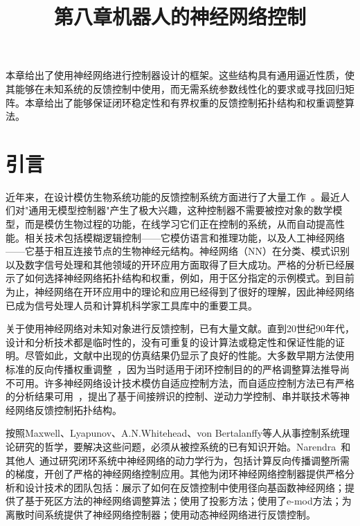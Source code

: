 \documentclass[12pt,a4paper]{ctexart}
\title{第八章\quad 机器人的神经网络控制}
\author{}
\date{}
\begin{document}
  \maketitle
\fi

本章给出了使用神经网络进行控制器设计的框架。这些结构具有通用逼近性质，使其能够在未知系统的反馈控制中使用，而无需系统参数线性化的要求或寻找回归矩阵。本章给出了能够保证闭环稳定性和有界权重的反馈控制拓扑结构和权重调整算法。

\section{引言}

近年来，在设计模仿生物系统功能的反馈控制系统方面进行了大量工作~\cite{white1992,miller1991}。最近人们对"通用无模型控制器"产生了极大兴趣，这种控制器不需要被控对象的数学模型，而是模仿生物过程的功能，在线学习它们正在控制的系统，从而自动提高性能。相关技术包括模糊逻辑控制——它模仿语言和推理功能，以及人工神经网络——它基于相互连接节点的生物神经元结构。神经网络（NN）在分类、模式识别以及数字信号处理和其他领域的开环应用方面取得了巨大成功。严格的分析已经展示了如何选择神经网络拓扑结构和权重，例如，用于区分指定的示例模式。到目前为止，神经网络在开环应用中的理论和应用已经得到了很好的理解，因此神经网络已成为信号处理人员和计算机科学家工具库中的重要工具。

关于使用神经网络对未知对象进行反馈控制，已有大量文献。直到20世纪90年代，设计和分析技术都是临时性的，没有可重复的设计算法或稳定性和保证性能的证明。尽管如此，文献中出现的仿真结果仍显示了良好的性能。大多数早期方法使用标准的反向传播权重调整~\cite{werbos1992}，因为当时适用于闭环控制目的的严格调整算法推导尚不可用。许多神经网络设计技术模仿自适应控制方法，而自适应控制方法已有严格的分析结果可用~\cite{astrom1989,landau1979,goodwin1984}，提出了基于间接辨识的控制、逆动力学控制、串并联技术等神经网络反馈控制拓扑结构。

按照Maxwell、Lyapunov、A.N.Whitehead、von Bertalanffy等人从事控制系统理论研究的哲学，要解决这些问题，必须从被控系统的已有知识开始。Narendra~\cite{narendra1991,narendra1991b}和其他人~\cite{miller1991,white1992,werbos1992}通过研究闭环系统中神经网络的动力学行为，包括计算反向传播调整所需的梯度，开创了严格的神经网络控制应用。其他为闭环神经网络控制器提供严格分析和设计技术的团队包括：\cite{sanner1991}展示了如何在反馈控制中使用径向基函数神经网络；\cite{chen1992,chen1994}提供了基于死区方法的神经网络调整算法；\cite{polycarpou1991,polycarpou1996}使用了投影方法；\cite{lewis1993,lewis1995}使用了e-mod方法；\cite{sadegh1993}为离散时间系统提供了神经网络控制器；\cite{rovithakis1994}使用动态神经网络进行反馈控制。
\end{document}
